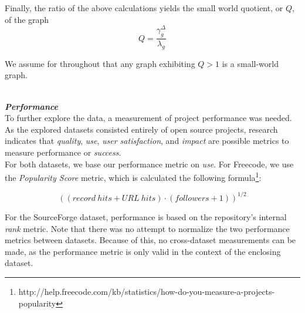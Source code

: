 \documentclass{proc}
\begin{document}
Finally, the ratio of the above calculations yields the small world quotient, or $Q$, of the graph
\[Q = \frac{\gamma^{\Delta}_g }{\lambda_g} \]

We assume for throughout that any graph exhibiting {$Q > 1$} is a small-world graph.

\noindent\\\textit{\textbf{Performance}}\\
To further explore the data, a measurement of project performance was needed. As the explored datasets consisted entirely of open source projects, research indicates that \textit{quality}, \textit{use}, \textit{user satisfaction}, and \textit{impact} are possible metrics to measure performance or \textit{success}\cite{crowston2003defining}.\\

For both datasets, we base our performance metric on \textit{use}. For Freecode, we use the \textit{Popularity Score} metric, which is calculated the following formula\footnote{http://help.freecode.com/kb/statistics/how-do-you-measure-a-projects-popularity}:


\[ ((record\ hits + URL\ hits) \cdot (followers + 1))^{1/2} \]

For the SourceForge dataset, performance is based on the repository's internal \textit{rank} metric. Note that there was no attempt to normalize the two performance metrics between datasets. Because of this, no cross-dataset measurements can be made, as the performance metric is only valid in the context of the enclosing dataset. 
\end{document}
